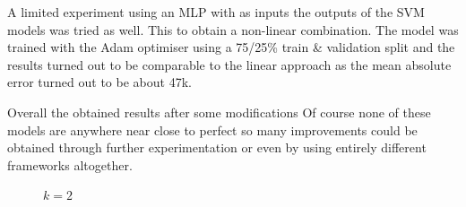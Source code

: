 \par A limited experiment using an MLP with as inputs the outputs of the SVM models was tried as well. This to obtain a non-linear combination. The model was trained with the Adam optimiser using a 75/25\% train \& validation split and the results turned out to be comparable to the linear approach as the mean absolute error turned out to be about 47k.

\par Overall the obtained results after some modifications Of course none of these models are anywhere near close to perfect so many improvements could be obtained through further experimentation or even by using entirely different frameworks altogether.

\endgroup

\begin{figure}[!htb]
\vspace{-0.5cm}
\centering
\begin{minipage}{\textwidth}
        \centering
        \hfil
	\hfil
	\hfil
	\caption*{$k=2$}
\end{minipage}
\begin{minipage}{\textwidth}

\end{minipage}
\end{figure}
